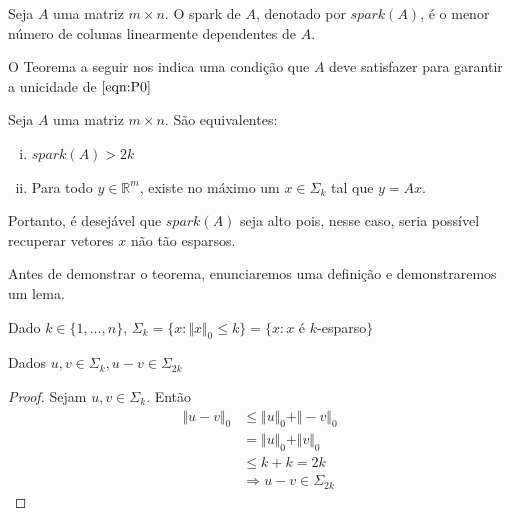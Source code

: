 \begin{definicao}
Seja $A$ uma matriz $m \times n$. O spark de $A$, denotado por $\textit{spark}(A)$, é o menor número de colunas linearmente dependentes de $A$.
\end{definicao}

O Teorema a seguir nos indica uma condição que $A$ deve satisfazer para garantir a unicidade de $\eqref{eqn:P0}$

\begin{teorema}
\label{thm:unicidade_P0}
Seja $A$ uma matriz $m \times n$. São equivalentes:

\begin{enumerate}[(i)]
\item $\textit{spark}(A)> 2k$

\item Para todo $y \in \mathbb{R}^m$, existe no máximo um $x \in \Sigma_k$ tal que $y = Ax$.
\end{enumerate}
\end{teorema}

Portanto, é desejável que $\textit{spark}(A)$ seja alto pois, nesse caso, seria possível recuperar vetores $x$ não tão esparsos.

Antes de demonstrar o teorema, enunciaremos uma definição e demonstraremos um lema.

\begin{definicao}
Dado $k \in \lbrace 1, \hdots , n \rbrace$,
$ \Sigma_k = \lbrace x : \Vert x \Vert_{0} \leq k \rbrace
           = \lbrace x : x $ é $k$-esparso$ \rbrace$
\end{definicao}

\begin{lema}
Dados $u, v \in \Sigma_k, u - v \in \Sigma_{2k}$
\end{lema}
\begin{proof}
Sejam $u, v \in \Sigma_k$. Então
\begin{subequations}
\begin{align*}
\Vert u - v \Vert_0 & \leq \Vert u \Vert_0 + \Vert -v \Vert_0 \\
& = \Vert u \Vert_0 + \Vert v \Vert_0 \\
& \leq k + k = 2k \\
& \Rightarrow u - v \in \Sigma_{2k}
\end{align*}
\end{subequations}
\end{proof}

